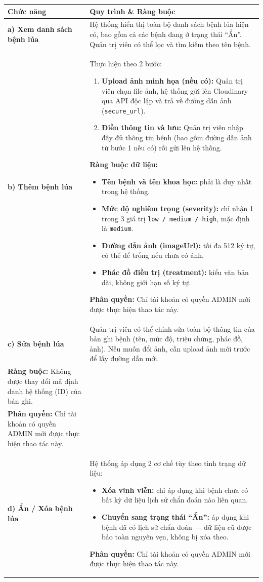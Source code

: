 \documentclass[12pt,a4paper]{article}
\begin{document}
\begin{longtable}{|
    >{\raggedright\arraybackslash}p{2.8cm}|
    >{\raggedright\arraybackslash}p{12cm}|}
\hline
\rowcolor{headerblue}
\textbf{Chức năng} & \textbf{Quy trình \& Ràng buộc} \\
\hline
\endhead
\textbf{a) Xem danh sách bệnh lúa} &
Hệ thống hiển thị toàn bộ danh sách bệnh lúa hiện có, bao gồm cả các bệnh đang ở trạng thái ``Ẩn''. Quản trị viên có thể lọc và tìm kiếm theo tên bệnh. \\
\hline
\textbf{b) Thêm bệnh lúa} &
Thực hiện theo 2 bước:
\begin{enumerate}[leftmargin=*,topsep=2pt,itemsep=1pt]
    \item \textbf{Upload ảnh minh họa (nếu có):} Quản trị viên chọn file ảnh, hệ thống gửi lên Cloudinary qua API độc lập và trả về đường dẫn ảnh (\texttt{secure\_url}).
    \item \textbf{Điền thông tin và lưu:} Quản trị viên nhập đầy đủ thông tin bệnh (bao gồm đường dẫn ảnh từ bước 1 nếu có) rồi gửi lên hệ thống.
\end{enumerate}
\textbf{Ràng buộc dữ liệu:}
\begin{itemize}[leftmargin=*,topsep=2pt,itemsep=1pt]
    \item \textbf{Tên bệnh và tên khoa học:} phải là duy nhất trong hệ thống.
    \item \textbf{Mức độ nghiêm trọng (severity):} chỉ nhận 1 trong 3 giá trị \texttt{low / medium / high}, mặc định là \texttt{medium}.
    \item \textbf{Đường dẫn ảnh (imageUrl):} tối đa 512 ký tự, có thể để trống nếu chưa có ảnh.
    \item \textbf{Phác đồ điều trị (treatment):} kiểu văn bản dài, không giới hạn số ký tự.
\end{itemize}
\textbf{Phân quyền:} Chỉ tài khoản có quyền ADMIN mới được thực hiện thao tác này. \\
\hline
\textbf{c) Sửa bệnh lúa} &
Quản trị viên có thể chỉnh sửa toàn bộ thông tin của bản ghi bệnh (tên, mức độ, triệu chứng, phác đồ, ảnh). Nếu muốn đổi ảnh, cần upload ảnh mới trước để lấy đường dẫn mới. \\
\textbf{Ràng buộc:} Không được thay đổi mã định danh hệ thống (ID) của bản ghi. \\
\textbf{Phân quyền:} Chỉ tài khoản có quyền ADMIN mới được thực hiện thao tác này. \\
\hline
\textbf{d) Ẩn / Xóa bệnh lúa} &
Hệ thống áp dụng 2 cơ chế tùy theo tình trạng dữ liệu:
\begin{itemize}[leftmargin=*,topsep=2pt,itemsep=1pt]
    \item \textbf{Xóa vĩnh viễn:} chỉ áp dụng khi bệnh chưa có bất kỳ dữ liệu lịch sử chẩn đoán nào liên quan.
    \item \textbf{Chuyển sang trạng thái ``Ẩn'':} áp dụng khi bệnh đã có lịch sử chẩn đoán --- dữ liệu cũ được bảo toàn nguyên vẹn, không bị xóa theo.
\end{itemize}
\textbf{Phân quyền:} Chỉ tài khoản có quyền ADMIN mới được thực hiện thao tác này. \\
\hline
\end{longtable}
 
\end{document}
